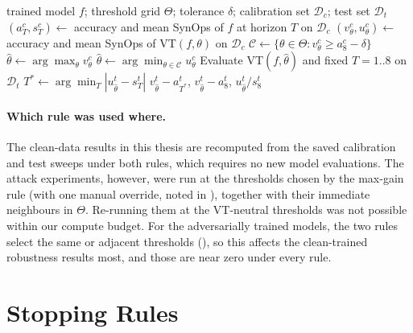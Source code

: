 \begin{algorithm}[htbp]
    \caption{VT-neutral operating-point selection and compute-matched reporting}
    \label{alg:neutral}
    \begin{algorithmic}[1]
        \Require trained model $f$; threshold grid $\Theta$; tolerance $\delta$; calibration set $\mathcal{D}_{c}$; test set $\mathcal{D}_{t}$
         
            \State $(a^{c}_T, s^{c}_T) \gets$ accuracy and mean SynOps of $f$ at horizon $T$ on $\mathcal{D}_c$
        \EndFor
        \For{$\theta \in \Theta$} 
            \State $(v^{c}_\theta, u^{c}_\theta) \gets$ accuracy and mean SynOps of VT$(f, \theta)$ on $\mathcal{D}_c$
        \EndFor
        \State $\mathcal{C} \gets \{\theta \in \Theta : v^{c}_\theta \geq a^{c}_8 - \delta\}$
            \State $\hat\theta \gets \arg\max_\theta v^{c}_\theta$ 
        \Else
            \State $\hat\theta \gets \arg\min_{\theta \in \mathcal{C}} u^{c}_\theta$
        \EndIf
        \State Evaluate VT$(f, \hat\theta)$ and fixed $T = 1..8$ on $\mathcal{D}_t$
        \State $T^{*} \gets \arg\min_T |u^{t}_{\hat\theta} - s^{t}_T|$ 
        \State \Return $v^{t}_{\hat\theta} - a^{t}_{T^*}$, \; $v^{t}_{\hat\theta} - a^{t}_8$, \; $u^{t}_{\hat\theta} / s^{t}_8$
    \end{algorithmic}
\end{algorithm}

\paragraph{Which rule was used where.} The clean-data results in this thesis are recomputed from the saved calibration and test sweeps under both rules, which requires no new model evaluations. The attack experiments, however, were run at the thresholds chosen by the max-gain rule (with one manual override, noted in ), together with their immediate neighbours in $\Theta$. Re-running them at the VT-neutral thresholds was not possible within our compute budget. For the adversarially trained models, the two rules select the same or adjacent thresholds (), so this affects the clean-trained robustness results most, and those are near zero under every rule.

\section{Stopping Rules}
\label{sec:meth-stoprules}

